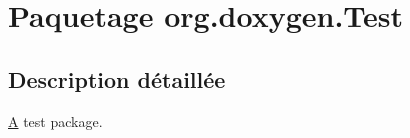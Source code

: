 \hypertarget{namespaceorg_1_1doxygen_1_1_test}{}\section{Paquetage org.\+doxygen.\+Test}
\label{namespaceorg_1_1doxygen_1_1_test}


\subsection{Description détaillée}
\hyperlink{class_a}{A} test package. 
